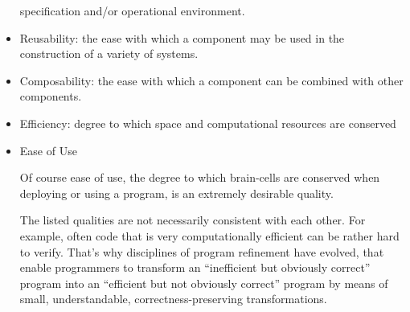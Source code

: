 \documentclass{ip3}
\begin{document}
\begin{foil}
\begin{itemize}
specification and/or operational environment.
\item Reusability: the ease with which a component may be used in the construction of a variety of systems.
\item Composability: the ease with which a component can be combined with other components.
\item Efficiency: degree to which space and computational resources are conserved
\item Ease of Use
\begin{note}
Of course ease of use, the degree to which brain-cells are conserved
when deploying or using a program, is an extremely desirable quality.

The listed qualities are not necessarily consistent with each
other. For example, often code that is very computationally efficient can be rather
hard to verify. That's why disciplines of program refinement have evolved,
that enable programmers to transform an ``inefficient but obviously 
correct'' program into an ``efficient but not obviously correct'' program
by means of small, understandable, correctness-preserving transformations.

\end{note}
\end{itemize}
\end{foil}
\end{document}
